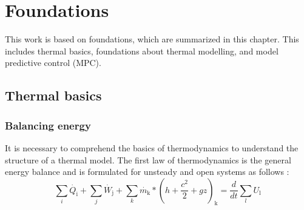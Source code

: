 \chapter{Foundations}
\label{ch:foundations}

This work is based on foundations, which are summarized in this chapter. This includes thermal basics, foundations about thermal modelling, and model predictive control (MPC). 

\section{Thermal basics}
\label{section:thermalbasics}

\subsection{Balancing energy}
\label{subsection:balancing energy}

    It is necessary to comprehend the basics of thermodynamics to understand the structure of a thermal model. The first law of thermodynamics is the general energy balance and is formulated for unsteady and open systems as follows \cite{Baehr.2016b}:
    \begin{equation}
        \label{eq:1HS}
        \sum_i \dot{Q_\text{i}} + \sum_j \dot{W_\text{j}} + \sum_k \dot{m_\text{k}}*(h + \frac{c^2}{2} + gz)_\text{k} = \frac{d}{dt} \sum_l U_\text{l}
    \end{equation}
    
